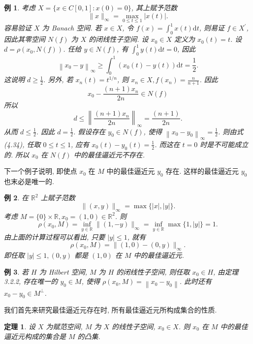 \documentclass[openany]{ctexbook}
\theoremstyle{kaiti}
\newtheorem{theorem}{定理}[section]
\theoremstyle{normal}
\newtheorem{example}{例}[section]
\begin{document}
\begin{example}
考虑 $X=\{x \in C[0,1]: x(0)=0\}$, 其上赋予范数
$$
\|x\|_{\infty}=\max_{0 \leq t \leq 1}|x(t)|.
$$
容易验证 $X$ 为 Banach 空间. 若 $x \in X$, 令 $f(x)=\int_0^1 x(t) \mathrm{d} t$, 则易证 $f \in X^{\prime}$, 因此其零空间 $N(f)$ 为 $X$ 的闭线性子空间. 设 $x_0 \in X$ 定义为 $x_0(t)=t$. 设 $d=\rho\left(x_0, N(f)\right)$. 任给 $y \in N(f)$, 有 $\int_0^1 y(t) \mathrm{d} t=0$, 因此
\begin{equation}
  \left\|x_0-y\right\|_{\infty} \geqslant \int_0^1\left(x_0(t)-y(t)\right) \mathrm{d} t=\frac{1}{2}.
\end{equation}
这说明 $d \geqslant \frac{1}{2}$. 另外, 若 $x_n(t)=t^{1 / n}$, 则 $x_n \in X, f\left(x_n\right)=\frac{n}{n+1}$. 因此
$$
x_0-\frac{(n+1) x_n}{2 n} \in N(f)
$$
所以
$$
d \leqslant\left\|\frac{(n+1) x_n}{2 n}\right\|_{\infty}=\frac{(n+1)}{2 n}.
$$
从而 $d \leqslant \frac{1}{2}$. 因此 $d=\frac{1}{2}$. 假设存在 $y_0 \in N(f)$, 使得 $\left\|x_0-y_0\right\|_{\infty}=\frac{1}{2}$. 则由式 (4.34), 任取 $0 \leqslant t \leqslant 1$, 应有 $x_0(t)-y_0(t)=\frac{1}{2}$. 而这在 $t=0$ 时是不可能成立的. 所以 $x_0$ 在 $N(f)$ 中的最佳逼近元不存在.
\end{example}

下一个例子说明, 即使点 $x_0$ 在 $M$ 中的最佳逼近元 $y_0$ 存在. 这样的最佳逼近元 $y_0$ 也末必是唯一的.

\begin{example}
在 $\mathbb{R}^2$ 上赋子范数
$$
\|(x, y)\|_{\infty}=\max\{|x|,|y|\}.
$$
考虑 $M=\{0\} \times \mathbb{R}, x_0=(1,0) \in \mathbb{R}^2$. 则
$$
\rho\left(x_0, M\right)=\inf_{y \in \mathbb{R}}\|(1,-y)\|_{\infty}=\inf_{y \in \mathbb{R}} \max\{1,|y|\}=1.
$$
由上面的计算过程可以看出, 只要 $|y| \leqslant 1$, 就有
$$
\rho\left(x_0, M\right)=\|(1,0)-(0, y)\|_{\infty}.
$$
即任取 $|y| \leqslant 1,(0, y)$ 都是 $(1,0)$ 在 $M$ 中的最佳逼近元.
\end{example}

\begin{example}
若 $H$ 为 Hilbert 空间, $M$ 为 $H$ 的闭线性子空间, 则任取 $x_0 \in H$, 由定理 3.2.2, 存在唯一的 $y_0 \in M$, 使得 $\rho\left(x_0, M\right)=\left\|x_0-y_0\right\|$. 此时还有 $x_0-y_0 \in M^{\perp}$.
\end{example}

我们首先来研究最佳逼近元存在时, 所有最佳逼近元所构成集合的性质.

\begin{theorem}
设 $X$ 为赋范空间, $M$ 为 $X$ 的线性子空间, $x_0 \in X$. 则 $x_0$ 在 $M$ 中的最佳逼近元构成的集合是 $M$ 的凸集.
\end{theorem}
\end{document}
